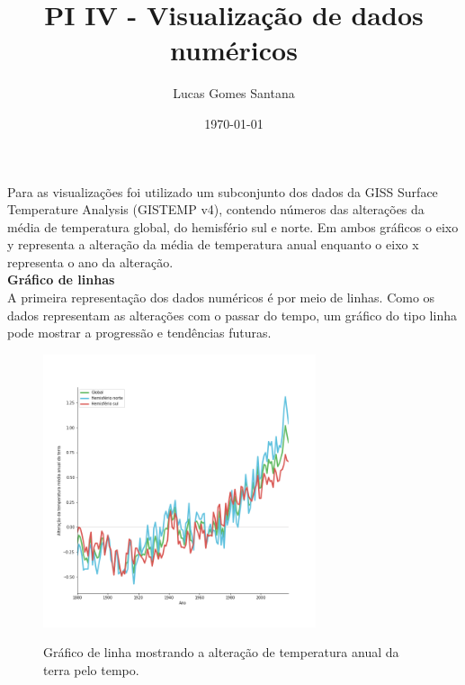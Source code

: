 \documentclass[12pt]{article}
\title{PI IV - Visualização de dados numéricos}
\author{Lucas Gomes Santana}
\date{\today}
\begin{document}
\maketitle

Para as visualizações foi utilizado um subconjunto dos dados da GISS Surface Temperature Analysis (GISTEMP v4)\cite{gistemp}, contendo números das alterações da média de temperatura global, do hemisfério sul e norte. Em ambos gráficos o eixo y representa a alteração da média de temperatura anual enquanto o eixo x representa o ano da alteração. \\

\textbf{\Large Gráfico de linhas}\\
A primeira representação dos dados numéricos é por meio de linhas.  Como os dados representam as alterações com o passar do tempo, um gráfico do tipo linha pode mostrar a progressão e tendências futuras.
\setcounter{figure}{0}
\begin{figure}[H]
\centering
\includegraphics[width = 0.714\textwidth]{lines.png}
\label{fig:A.1}
\caption{Gráfico de linha mostrando a alteração de temperatura anual da terra pelo tempo.}
\end{figure}
\end{document}
